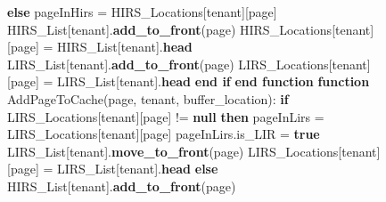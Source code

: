 \begin{figure}[htbp]
\begin{minipage}{\linewidth}
\begin{algorithm}[H]
\begin{algorithmic}
            \STATE \hspace{\algorithmicindent} \textbf{else}
            \STATE \hspace{\algorithmicindent} \hspace{\algorithmicindent} pageInHirs = HIRS\_Locations[tenant][page]
            \STATE \hspace{\algorithmicindent} \hspace{\algorithmicindent} HIRS\_List[tenant].\textbf{add\_to\_front}(page)
            \STATE \hspace{\algorithmicindent} \hspace{\algorithmicindent} HIRS\_Locations[tenant][page] = HIRS\_List[tenant].\textbf{head}
            \STATE \hspace{\algorithmicindent} \hspace{\algorithmicindent} LIRS\_List[tenant].\textbf{add\_to\_front}(page) 
            \STATE \hspace{\algorithmicindent} \hspace{\algorithmicindent} LIRS\_Locations[tenant][page] = LIRS\_List[tenant].\textbf{head}
            \STATE \hspace{\algorithmicindent} \textbf{end if}
            \STATE \textbf{end function}
            \STATE
            \STATE \textbf{function} AddPageToCache(page, tenant, buffer\_location):
            \STATE \hspace{\algorithmicindent} \textbf{if} LIRS\_Locations[tenant][page] != \textbf{null} \textbf{then}
            \STATE \hspace{\algorithmicindent} \hspace{\algorithmicindent} pageInLirs = LIRS\_Locations[tenant][page]
            \STATE \hspace{\algorithmicindent} \hspace{\algorithmicindent} pageInLirs.is\_LIR = \textbf{true}
            \STATE \hspace{\algorithmicindent} \hspace{\algorithmicindent} LIRS\_List[tenant].\textbf{move\_to\_front}(page)
            \STATE \hspace{\algorithmicindent} \hspace{\algorithmicindent} LIRS\_Locations[tenant][page] = LIRS\_List[tenant].\textbf{head}
            \STATE \hspace{\algorithmicindent} \textbf{else}
            \STATE \hspace{\algorithmicindent} \hspace{\algorithmicindent} HIRS\_List[tenant].\textbf{add\_to\_front}(page)

\end{algorithmic}
\end{algorithm}
\end{minipage}
\end{figure}
